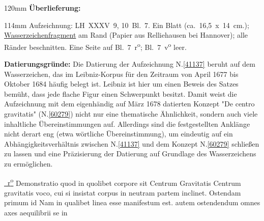 \begin{ledgroupsized}[r]{120mm}
\footnotesize
\pstart
\noindent\textbf{Überlieferung:}
\pend
\end{ledgroupsized}
\begin{ledgroupsized}[r]{114mm}
\footnotesize
\pstart
\parindent -6mm
%
Aufzeichnung:
LH~XXXV~9, 10~Bl.~7. 
Ein Blatt (ca.~16,5~x~14~cm.);		%
\href{\Scan{LH_35_09_10_007wz}}%
{Wasserzeichenfragment} am Rand (Papier aus Relliehausen bei Hannover);
alle Ränder beschnitten.
Eine Seite auf Bl.~7~r\textsuperscript{o}; Bl.~7~v\textsuperscript{o} leer.
\pend
\end{ledgroupsized}
\vspace{5mm}
\begin{ledgroup}
\footnotesize
\pstart
\noindent
\textbf{Datierungsgründe:}
Die Datierung der Aufzeichnung N.\;\ref{41137} beruht auf dem Wasserzeichen, das im Leibniz-Korpus für den Zeitraum von April 1677 bis Oktober 1684 häufig belegt ist.
\pend
\pstart
Leibniz ist hier um einen Beweis des Satzes bemüht, dass jede flache Figur einen Schwerpunkt besitzt. Damit weist die Aufzeichnung mit dem eigenhändig auf März 1678 datierten Konzept "De centro gravitatis" (N.\;\ref{60279}) nicht nur eine thematische Ähnlichkeit, sondern auch viele inhaltliche Übereinstimmungen auf.
Allerdings sind die festgestellten Anklänge nicht derart eng (etwa wörtliche Übereinstimmung), um eindeutig auf ein Abhängigkeitsverhältnis zwischen N.\;\ref{41137} und dem Konzept N.\;\ref{60279} schließen zu lassen und eine Präzisierung der Datierung auf Grundlage des Wasserzeichens zu ermöglichen.
\pend
\end{ledgroup}
\vspace{8mm}
\pstart
\centering
\href{\Scan{LH_35_09_10_007r}}%
{~r\textsuperscript{o}\rbrack}
\hfill
Demonstratio quod in quolibet corpore sit Centrum Gravitatis
\hfill
{}
\pend
\nobreak
\vspace{0.5\baselineskip}
\pstart\noindent 
Centrum gravitatis voco, cui si insistat corpus in neutram partem inclinet. 
Ostendam primum id
Nam in qualibet linea esse manifestum est. 
autem ostendendum omnes axes aequilibrii se in 
